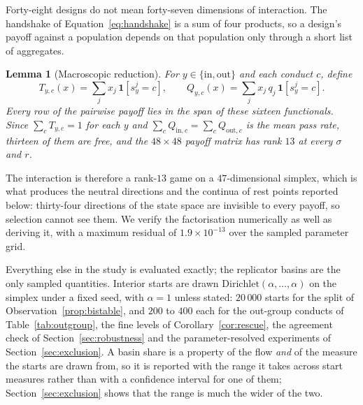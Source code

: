 \documentclass[a4paper,fleqn,longmktitle]{cas-sc}
\theoremstyle{plain}
\newtheorem{lemma}[theorem]{Lemma}
\theoremstyle{definition}
\begin{document}
Forty-eight designs do not mean forty-seven dimensions of interaction. The
handshake of Equation~\eqref{eq:handshake} is a sum of four products, so a
design's payoff against a population depends on that population only through a
short list of aggregates.

\begin{lemma}[Macroscopic reduction]
\label{lem:rank}
For $y \in \{\mathrm{in}, \mathrm{out}\}$ and each conduct $c$, define
\begin{equation}
\label{eq:macro}
T_{y,c}(x) = \sum_{j} x_j\,\mathbf{1}\!\left[s^{j}_{y} = c\right],
\qquad
Q_{y,c}(x) = \sum_{j} x_j\, q_j\,\mathbf{1}\!\left[s^{j}_{y} = c\right].
\end{equation}
Every row of the pairwise payoff lies in the span of these sixteen functionals.
Since $\sum_c T_{y,c} = 1$ for each $y$ and $\sum_c Q_{\mathrm{in},c} =
\sum_c Q_{\mathrm{out},c}$ is the mean pass rate, thirteen of them are free, and
the $48 \times 48$ payoff matrix has rank $13$ at every $\sigma$ and $r$.
\end{lemma}

The interaction is therefore a rank-$13$ game on a $47$-dimensional simplex,
which is what produces the neutral directions and the continua of rest points
reported below: thirty-four directions of the state space are invisible to
every payoff, so selection cannot see them. We verify the factorisation
numerically as well as deriving it, with a maximum residual of
$1.9 \times 10^{-13}$ over the sampled parameter grid.

Everything else in the study is evaluated exactly; the replicator basins are
the only sampled quantities. Interior
starts are drawn $\mathrm{Dirichlet}(\alpha, \dots, \alpha)$ on the simplex
under a fixed seed, with $\alpha = 1$ unless stated: $20\,000$ starts for the
split of Observation~\ref{prop:bistable}, and $200$ to $400$ each for the
out-group conducts of Table~\ref{tab:outgroup}, the fine levels of
Corollary~\ref{cor:rescue}, the agreement check of
Section~\ref{sec:robustness} and the parameter-resolved experiments of
Section~\ref{sec:exclusion}. A basin share is a property of the flow
\emph{and} of the measure the starts are drawn from, so it is reported with the
range it takes across start measures rather than with a confidence interval for
one of them; Section~\ref{sec:exclusion} shows that the range is much the wider
of the two.
\end{document}

